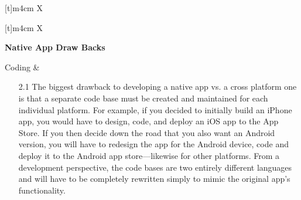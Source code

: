\begin{center}
\begin{tabularx}{\textwidth}[t]{m{4cm} X}
\end{tabularx}
\end{center}

\begin{center}
\begin{tabularx}{\textwidth}[t]{m{4cm} X}

\hline
\textbf{\textcolor{myGreen}{Native App Draw Backs}} \\
\hline

Coding &
\begin{minipage}[t]{\linewidth}%
\begin{itemize}
\item[2.1] The biggest drawback to developing a native app vs. a cross platform one is that a separate
code base must be created and maintained for each individual platform. For example, if you decided to
initially build an iPhone app, you would have to design, code, and deploy an iOS app to the App Store.
If you then decide down the road that you also want an Android version, you will have to redesign the
app for the Android device, code and deploy it to the Android app store---likewise for other platforms.
From a development perspective, the code bases are two entirely different languages and will have to
be completely rewritten simply to mimic the original app's functionality.\\
\end{itemize}
\end{minipage}\\

\end{tabularx}
\end{center}


